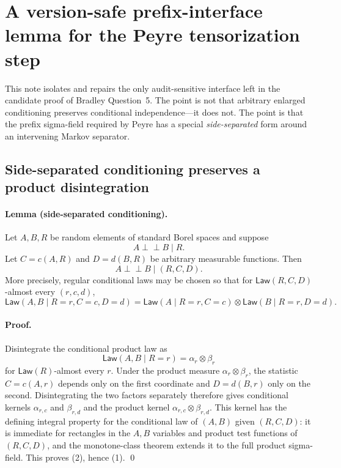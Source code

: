 
\section{A version-safe prefix-interface lemma for the Peyre tensorization step}

This note isolates and repairs the only audit-sensitive interface left in the
candidate proof of Bradley Question~5.  The point is not that arbitrary enlarged
conditioning preserves conditional independence---it does not.  The point is that
the prefix sigma-field required by Peyre has a special \emph{side-separated}
form around an intervening Markov separator.

\subsection{Side-separated conditioning preserves a product disintegration}

\paragraph{Lemma (side-separated conditioning).}
Let $A,B,R$ be random elements of standard Borel spaces and suppose
\[
 A\perp\!\!\!\perp B\mid R.
\]
Let $C=c(A,R)$ and $D=d(B,R)$ be arbitrary measurable functions.  Then
\[
 A\perp\!\!\!\perp B\mid (R,C,D).
\tag{1}
\]
More precisely, regular conditional laws may be chosen so that for
$\mathsf{Law}(R,C,D)$-almost every $(r,c,d)$,
\[
 \mathsf{Law}(A,B\mid R=r,C=c,D=d)
 =\mathsf{Law}(A\mid R=r,C=c)\otimes
  \mathsf{Law}(B\mid R=r,D=d).
\tag{2}
\]

\paragraph{Proof.}
Disintegrate the conditional product law as
\[
 \mathsf{Law}(A,B\mid R=r)=\alpha_r\otimes\beta_r
\]
for $\mathsf{Law}(R)$-almost every $r$.  Under the product measure
$\alpha_r\otimes\beta_r$, the statistic $C=c(A,r)$ depends only on the first
coordinate and $D=d(B,r)$ only on the second.  Disintegrating the two factors
separately therefore gives conditional kernels $\alpha_{r,c}$ and
$\beta_{r,d}$ and the product kernel
$\alpha_{r,c}\otimes\beta_{r,d}$.  This kernel has the defining integral
property for the conditional law of $(A,B)$ given $(R,C,D)$: it is immediate
for rectangles in the $A,B$ variables and product test functions of $(R,C,D)$,
and the monotone-class theorem extends it to the full product sigma-field.
This proves (2), hence (1). \qed

